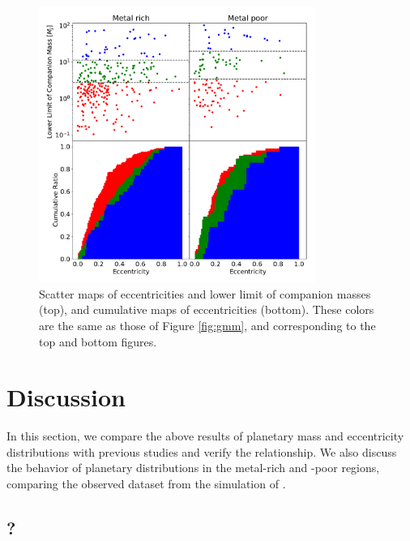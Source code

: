 \documentclass[twocolumn, dvipdfmx]{aastex62}
\begin{document}
\begin{CJK*}{UTF8}{min}
\begin{figure}[t]
\begin{center}
\includegraphics[width=9cm]{../../../Figure/e_Mp_merge.pdf}
\caption{Scatter maps of eccentricities and lower limit of companion masses (top), and cumulative maps of eccentricities (bottom). These colors are the same as those of Figure \ref{fig:gmm}, and corresponding to the top and bottom figures. \label{fig:e_Mp}}
\end{center}
\end{figure}


\section{Discussion}

In this section, we compare the above results of planetary mass and eccentricity distributions with previous studies and verify the relationship. We also discuss the behavior of planetary distributions in the metal-rich and -poor regions, comparing the observed dataset from the simulation of \cite{2012A&A...541A..97M}.


\subsection{?}


\end{CJK*}
\end{document}
